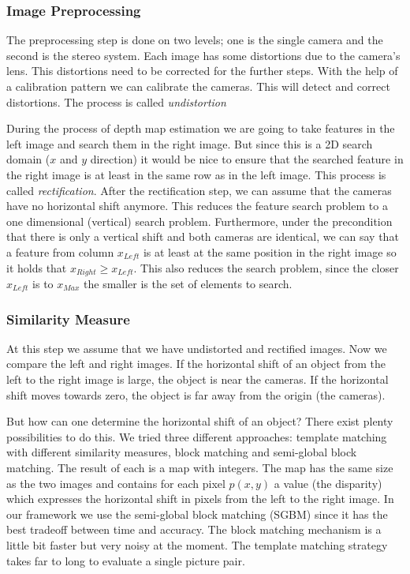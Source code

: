 \documentclass[11pt]{article}
\begin{document}
\subsubsection{Image Preprocessing} %
The preprocessing step is done on two levels; one is the single camera and the second is the stereo system. Each image has some distortions due to the camera's lens. This distortions need to be corrected for the further steps. With the help of a calibration pattern we can calibrate the cameras. This will detect and correct distortions. The process is called \emph{undistortion}

During the process of depth map estimation we are going to take features in the left image and search them in the right image. But since this is a 2D search domain ($x$ and $y$ direction) it would be nice to ensure that the searched feature in the right image is at least in the same row as in the left image. This process is called \emph{rectification}. After the rectification step, we can assume that the cameras have no horizontal shift anymore. This reduces the feature search problem to a one dimensional (vertical) search problem. Furthermore, under the precondition that there is only a vertical shift and both cameras are identical, we can say that a feature from column $x_{Left}$ is at least at the same position in the right image so it holds that $x_{Right}\geq x_{Left}$. This also reduces the search problem, since the closer $x_{Left}$ is to $x_{Max}$ the smaller is the set of elements to search.

\subsubsection{Similarity Measure}
At this step we assume that we have undistorted and rectified images. Now we compare the left and right images. If the horizontal shift of an object from the left to the right image is large, the object is near the cameras. If the horizontal shift moves towards zero, the object is far away from the origin (the cameras).

But how can one determine the horizontal shift of an object? There exist plenty possibilities to do this. We tried three different approaches: template matching with different similarity measures, block matching and semi-global block matching. The result of each is a map with integers. The map has the same size as the two images and contains for each pixel $p(x,y)$ a value (the disparity) which expresses the horizontal shift in pixels from the left to the right image. In our framework we use the semi-global block matching (SGBM) since it has the best tradeoff between time and accuracy. The block matching mechanism is a little bit faster but very noisy at the moment. The template matching strategy takes far to long to evaluate a single picture pair. 
\end{document}
